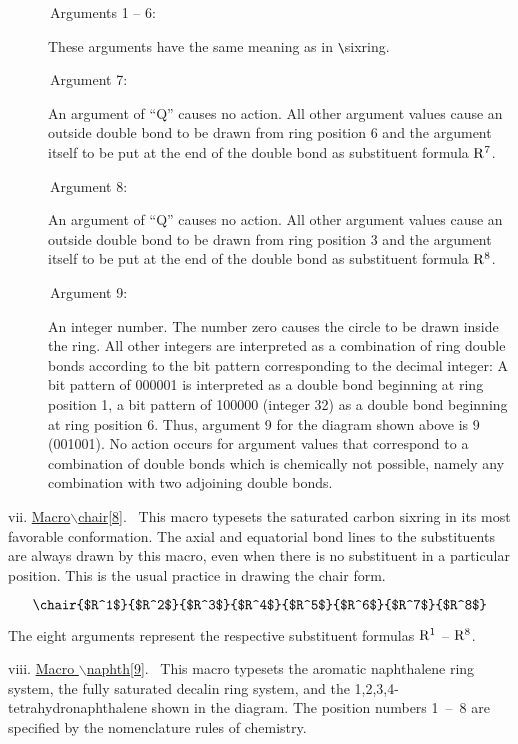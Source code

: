  \begin{description}
 \item[{\rm \ \ \ \ \ \ Arguments 1 -- 6:}] These arguments have the
      same meaning as in \verb+\+sixring.
 \item[{\rm \ \ \ \ \ \ Argument 7:}] An argument of ``Q'' causes
      no action. All other argument values cause an outside 
      double bond to be drawn from ring position 6 and the
      argument itself to be put at the end of the double bond
      as substituent formula ${\rm R^7}$.
 \item[{\rm \ \ \ \ \ \ Argument 8:}] An argument of ``Q'' causes
      no action. All other argument values cause an outside
      double bond to be drawn from ring position 3 and the
      argument itself to be put at the end of the double bond
      as substituent formula ${\rm R^8}$.
 \item[{\rm \ \ \ \ \ \ Argument 9:}] An integer number. The number
      zero causes the circle to be drawn inside the ring.
      All other integers are interpreted as a combination of
      ring double bonds according to the bit pattern corresponding
      to the decimal integer: A bit pattern of 000001 is interpreted
      as a double bond beginning at ring position 1, a bit pattern
      of 100000 (integer 32) as a double bond beginning at ring
      position 6. Thus, argument 9 for the diagram shown above
      is 9 (001001).
      No action occurs for argument values that correspond to
      a combination of double bonds which is chemically not
      possible, namely any combination with two adjoining
      double bonds.
 \end{description}
 
 \vspace{\len mm}
 \indent vii. \underline{Macro$\backslash $chair[8]}.
 \ This macro typesets the saturated carbon sixring in its most
 favorable conformation. The axial and equatorial bond lines
 to the substituents are always drawn by this macro, even when
 there is no substituent in a particular position. This is the
 usual practice in drawing the chair form.

 \[ \chair{$R^1$}{$R^2$}{$R^3$}{$R^4$}{$R^5$}{$R^6$}{$R^7$}{$R^8$} \]

 The eight arguments represent the respective substituent formulas
 ${\rm R^1}$ -- ${\rm R^8}$.

 \pagebreak
 \indent viii. \underline{Macro $\backslash $naphth[9]}.
 \ This macro typesets the aromatic naphthalene ring system, 
 the fully saturated decalin ring system, and the         
 1,2,3,4-tetra\-hydro\-naphthalene shown in the diagram. The position
 numbers 1~--~8 are specified by the nomenclature rules of
 chemistry.

